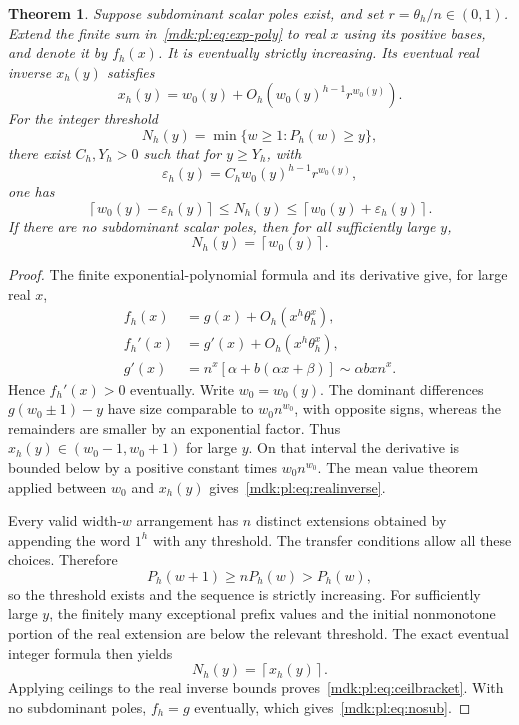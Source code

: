 \documentclass[11pt,letterpaper]{article}
\numberwithin{equation}{section}
\newtheorem{theorem}{Theorem}[section]
\theoremstyle{remark}\newtheorem{remark}[theorem]{Remark}
\newcommand{\ceil}[1]{\left\lceil #1\right\rceil}
\begin{document}
\begin{theorem}\label{mdk:pl:thm:inverse}
Suppose subdominant scalar poles exist, and set $r=\theta_h/n\in(0,1)$. Extend the finite sum in~\eqref{mdk:pl:eq:exp-poly} to real $x$ using its positive bases, and denote it by $f_h(x)$. It is eventually strictly increasing. Its eventual real inverse $x_h(y)$ satisfies
\begin{equation}\label{mdk:pl:eq:realinverse}
 x_h(y)=w_0(y)+O_h\!\left(w_0(y)^{h-1}r^{w_0(y)}\right).
\end{equation}
For the integer threshold
\begin{equation}\label{mdk:pl:eq:thresholdN}
 N_h(y)=\min\{w\ge1:P_h(w)\ge y\},
\end{equation}
there exist $C_h,Y_h>0$ such that for $y\ge Y_h$, with
\[
 \varepsilon_h(y)=C_h w_0(y)^{h-1}r^{w_0(y)},
\]
one has
\begin{equation}\label{mdk:pl:eq:ceilbracket}
 \ceil{w_0(y)-\varepsilon_h(y)}\le N_h(y)
 \le\ceil{w_0(y)+\varepsilon_h(y)}.
\end{equation}
If there are no subdominant scalar poles, then for all sufficiently large $y$,
\begin{equation}\label{mdk:pl:eq:nosub}
 N_h(y)=\ceil{w_0(y)}.
\end{equation}
\end{theorem}
\begin{proof}
The finite exponential-polynomial formula and its derivative give, for large real $x$,
\begin{align*}
 f_h(x)&=g(x)+O_h(x^h\theta_h^x),\\
 f_h'(x)&=g'(x)+O_h(x^h\theta_h^x),\\
 g'(x)&=n^x[\alpha+b(\alpha x+\beta)]\sim\alpha b x n^x.
\end{align*}
Hence $f_h'(x)>0$ eventually. Write $w_0=w_0(y)$. The dominant differences $g(w_0\pm1)-y$ have size comparable to $w_0n^{w_0}$, with opposite signs, whereas the remainders are smaller by an exponential factor. Thus $x_h(y)\in(w_0-1,w_0+1)$ for large $y$. On that interval the derivative is bounded below by a positive constant times $w_0n^{w_0}$. The mean value theorem applied between $w_0$ and $x_h(y)$ gives~\eqref{mdk:pl:eq:realinverse}.

Every valid width-$w$ arrangement has $n$ distinct extensions obtained by appending the word $1^h$ with any threshold. The transfer conditions allow all these choices. Therefore
\[
 P_h(w+1)\ge nP_h(w)>P_h(w),
\]
so the threshold exists and the sequence is strictly increasing. For sufficiently large $y$, the finitely many exceptional prefix values and the initial nonmonotone portion of the real extension are below the relevant threshold. The exact eventual integer formula then yields
\[
 N_h(y)=\ceil{x_h(y)}.
\]
Applying ceilings to the real inverse bounds proves~\eqref{mdk:pl:eq:ceilbracket}. With no subdominant poles, $f_h=g$ eventually, which gives~\eqref{mdk:pl:eq:nosub}.
\end{proof}
\end{document}
